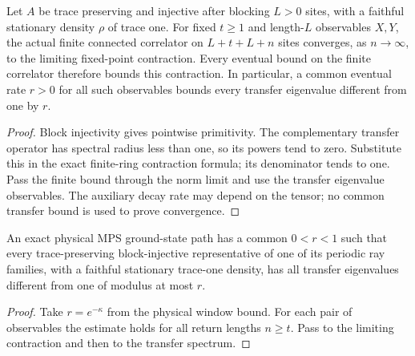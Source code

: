 \begin{lemma}
    \label{lem:spt_actual_finite_ring_correlation_limit}
    \leanok
    Let $A$ be trace preserving and injective after blocking $L>0$ sites,
    with a faithful stationary density $\rho$ of trace one. For fixed
    $t\ge1$ and length-$L$ observables $X,Y$, the actual finite connected
    correlator on $L+t+L+n$ sites converges, as $n\to\infty$, to the
    limiting fixed-point contraction. Every eventual bound on the
    finite correlator therefore bounds this contraction. In particular,
    a common eventual rate $r>0$ for all such observables bounds every
    transfer eigenvalue different from one by $r$.
\end{lemma}
\begin{proof}\leanok
    Block injectivity gives pointwise primitivity. The complementary
    transfer operator has spectral radius less than one, so its powers
    tend to zero. Substitute this in the exact finite-ring contraction
    formula; its denominator tends to one. Pass the finite bound through
    the norm limit and use the transfer eigenvalue observables.
    The auxiliary decay rate may depend on the tensor; no common transfer
    bound is used to prove convergence.
\end{proof}

\begin{lemma}
    \label{thm:spt_physical_gap_tp_transfer_bound}
    \leanok
    An exact physical MPS ground-state path has a common $0<r<1$ such
    that every trace-preserving block-injective representative of one of
    its periodic ray families, with a faithful stationary trace-one
    density, has all transfer eigenvalues different from one of modulus
    at most $r$.
\end{lemma}
\begin{proof}\leanok
    Take $r=e^{-\kappa}$ from the physical window bound. For each pair
    of observables the estimate holds for all return lengths $n\ge t$.
    Pass to the limiting contraction and then to the transfer spectrum.
\end{proof}

